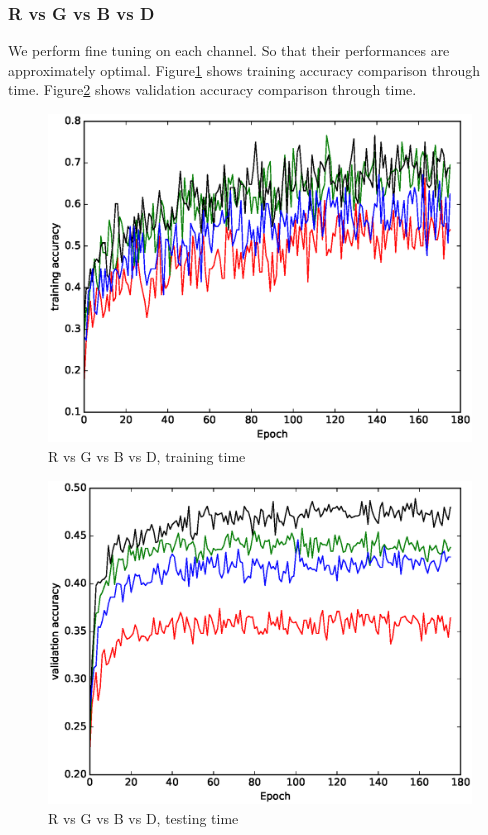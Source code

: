 \documentclass[10pt,twocolumn,letterpaper]{article}
\begin{document}
\subsubsection{R vs G vs B vs D}
We perform fine tuning on each channel. So that their performances are approximately optimal.
Figure\ref{fig:channeltrain} shows training accuracy comparison through time. 
Figure\ref{fig:channeltest} shows validation accuracy comparison through time. 
\begin{figure}
\includegraphics[width=\linewidth]{../presentation/train.eps}
\caption{R vs G vs B vs D, training time}
\label{fig:channeltrain}
\end{figure}
\begin{figure}
\includegraphics[width=\linewidth]{../presentation/test.eps}
\caption{R vs G vs B vs D, testing time}
\label{fig:channeltest}
\end{figure}
\end{document}
